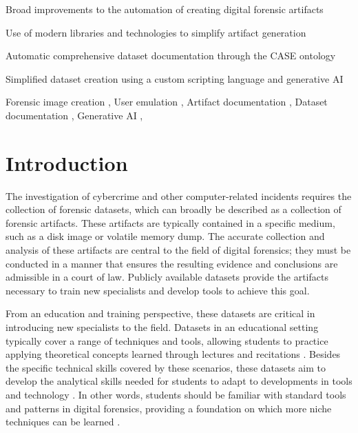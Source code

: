 \documentclass[final,5p,times,twocolumn]{elsarticle}
\begin{document}
\begin{frontmatter}
\begin{highlights}
\item Broad improvements to the automation of creating digital forensic artifacts
\item Use of modern libraries and technologies to simplify artifact generation
\item Automatic comprehensive dataset documentation through the CASE ontology
\item Simplified dataset creation using a custom scripting language and generative AI
\end{highlights}
    
\begin{keyword}
Forensic image creation \sep
User emulation \sep
Artifact documentation \sep
Dataset documentation \sep
Generative AI \sep
\end{keyword}

\end{frontmatter}

\section{Introduction}\label{introduction}

The investigation of cybercrime and other computer-related incidents
requires the collection of forensic datasets, which can broadly be
described as a collection of forensic artifacts. These artifacts are
typically contained in a specific medium, such as a disk image or
volatile memory dump. The accurate collection and analysis of these
artifacts are central to the field of digital forensics; they must be
conducted in a manner that ensures the resulting evidence and
conclusions are admissible in a court of law. Publicly available
datasets provide the artifacts necessary to train new specialists and
develop tools to achieve this goal.

From an education and training perspective, these datasets are critical
in introducing new specialists to the field. Datasets in an educational
setting typically cover a range of techniques and tools, allowing
students to practice applying theoretical concepts learned through
lectures and recitations
\citep{adelsteinAutomaticallyCreatingRealistic2005}. Besides the
specific technical skills covered by these scenarios, these datasets aim
to develop the analytical skills needed for students to adapt to
developments in tools and technology
\citep{cooperStandardsDigitalForensics2010}. In other words, students
should be familiar with standard tools and patterns in digital
forensics, providing a foundation on which more niche techniques can be
learned \citep{lawrenceFrameworkDesignWebbased2009}.
\end{document}
